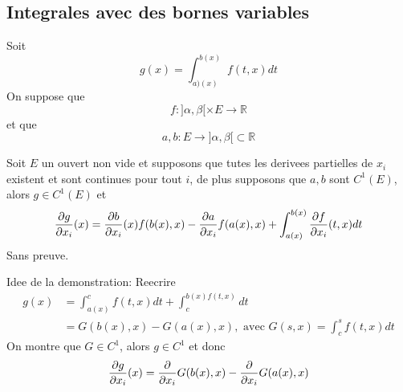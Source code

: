 \documentclass[../main.tex]{subfiles}
\begin{document}
\subsection{Integrales avec des bornes variables}
Soit
\[ 
	g( x) = \int_{ a)( x)  }^{ b( x)  }f( t,x) dt
\]
On suppose que 
\[ 
	f: ]\alpha,\beta[ \times E \to \mathbb{R}
\]
et que
\[ 
	a,b: E \to ]\alpha,\beta[ \subset \mathbb{R}
\]
\begin{thm}
	Soit $E$ un ouvert non vide et supposons que tutes les derivees partielles de $x_i$ existent et sont continues pour tout $i$, de plus supposons que $a,b$ sont $C^{1}( E)$, alors $g \in C^{1}( E) $ et
	\[ 
		\frac{\partial g}{\partial x_i} ( x) = \frac{\partial b}{\partial x_i}( x) f( b( x) ,x) - \frac{\partial a}{\partial x_i}f( a( x), x )  + \int_{ a( x)  }^{ b( x)  } \frac{\partial f}{\partial x_i} ( t,x) dt
	\]
Sans preuve.\\

\end{thm}
Idee de la demonstration:
Reecrire
\begin{align*}
	g( x) &= \int_{ a( x)  }^{ c } f( t,x)  dt + \int_{ c }^{ b(x) f( t,x)  }dt\\
	      &= G( b( x) ,x) - G( a( x) ,x) , \text{ avec } G(s,x ) = \int_{ c }^{ s } f( t,x) dt		
\end{align*}
On montre que $G \in C^{1}$, alors $g \in C^{1}$ et donc
\begin{align*}
\frac{\partial g}{\partial x_i}( x) = \frac{\partial }{\partial x_i} G( b( x) ,x) - \frac{\partial }{\partial x_i} G( a( x) ,x) 
\end{align*}
\end{document}
